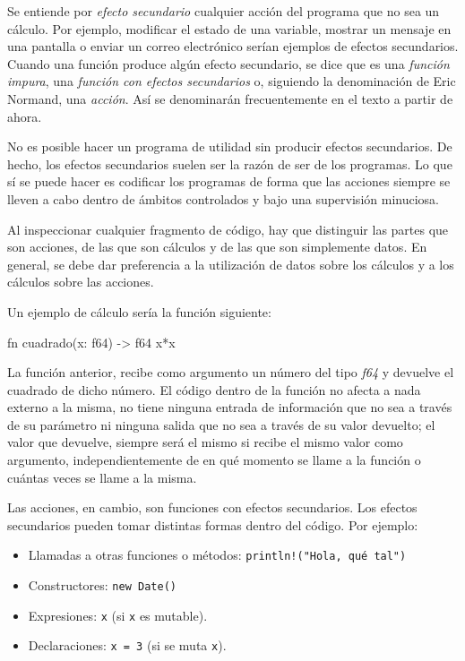 Se entiende por \textit{efecto secundario} cualquier acción del programa que no sea un cálculo. Por ejemplo, modificar el estado de una variable, mostrar un mensaje en una pantalla o enviar un correo electrónico serían ejemplos de efectos secundarios. Cuando una función produce algún efecto secundario, se dice que es una \textit{función impura}, una \textit{función con efectos secundarios} o, siguiendo la denominación de Eric Normand, una \textit{acción}. Así se denominarán frecuentemente en el texto a partir de ahora.

No es posible hacer un programa de utilidad sin producir efectos secundarios. De hecho, los efectos secundarios suelen ser la razón de ser de los programas. Lo que sí se puede hacer es codificar los programas de forma que las acciones siempre se lleven a cabo dentro de ámbitos controlados y bajo una supervisión minuciosa.

Al inspeccionar cualquier fragmento de código, hay que distinguir las partes que son acciones, de las que son cálculos y de las que son simplemente datos. En general, se debe dar preferencia a la utilización de datos sobre los cálculos y a los cálculos sobre las acciones.

\pagebreak

Un ejemplo de cálculo sería la función siguiente:

\vspace{0.7em}
\begin{Codigo}
fn cuadrado(x: f64) -> f64 {
   x*x
}
\end{Codigo}

La función anterior, recibe como argumento un número del tipo \textit{f64} y devuelve el cuadrado de dicho número. El código dentro de la función no afecta a nada externo a la misma, no tiene ninguna entrada de información que no sea a través de su parámetro ni ninguna salida que no sea a través de su valor devuelto; el valor que devuelve, siempre será el mismo si recibe el mismo valor como argumento, independientemente de en qué momento se llame a la función o cuántas veces se llame a la misma. 

Las acciones, en cambio, son funciones con efectos secundarios. Los efectos secundarios pueden tomar distintas formas dentro del código. Por ejemplo:
\begin{itemize}
   \item Llamadas a otras funciones o métodos: \texttt{println!("Hola, qué tal")}   
   \item Constructores: \texttt{new Date()}
   \item Expresiones: \texttt{x} (si \texttt{x} es mutable).   
   \item Declaraciones: \texttt{x = 3} (si se muta \texttt{x}).
\end{itemize}

